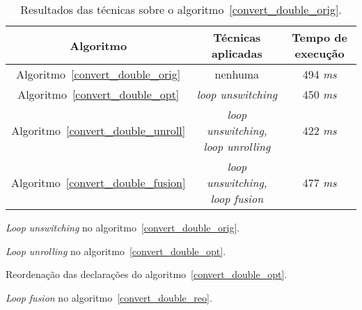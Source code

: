 \begin{table}[H]
  \caption{Resultados das técnicas sobre o algoritmo~\ref{convert_double_orig}.}
  \label{tabela_convert_double}
\begin{center}
  \begin{tabular}{c|c|c}
    Algoritmo & Técnicas aplicadas & Tempo de execução\\
    \hline
    Algoritmo~\ref{convert_double_orig} & nenhuma & 494 \textit{ms} \\
    \hline
    Algoritmo~\ref{convert_double_opt} & \textit{loop unswitching} & 450 \textit{ms} \\
    \hline
    Algoritmo~\ref{convert_double_unroll} & \textit{loop unswitching, loop
                                unrolling}& 422 \textit{ms} \\
    \hline
    Algoritmo~\ref{convert_double_fusion} & \textit{loop unswitching, loop fusion} & 477 \textit{ms} \\
    \hline
  \end{tabular}
\end{center}
\end{table}



\begin{algorithm}[H]
  \caption{\textit{Loop unswitching} no algoritmo~\ref{convert_double_orig}.}
\label{convert_double_opt}

\end{algorithm}

\begin{algorithm}[H]
  \caption{\textit{Loop unrolling} no algoritmo~\ref{convert_double_opt}.}
\label{convert_double_unroll}

\end{algorithm}

\begin{algorithm}[H]
  \caption{Reordenação das declarações do algoritmo~\ref{convert_double_opt}.}
\label{convert_double_reo}

\end{algorithm}

\begin{algorithm}[H]
  \caption{\textit{Loop fusion} no algoritmo~\ref{convert_double_reo}.}
\label{convert_double_fusion}

\end{algorithm}
